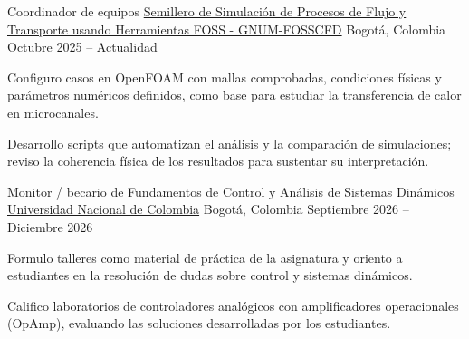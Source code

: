 

\begin{cventries}



\cventry
    {Coordinador de equipos} %
    {\href{http://www.hermes.unal.edu.co/pages/Consultas/Semillero.xhtml?id=7505}{Semillero de Simulación de Procesos de Flujo y Transporte usando Herramientas FOSS - GNUM-FOSSCFD}} %
    {Bogotá, Colombia} %
    {Octubre 2025 -- Actualidad} %
    {
    \begin{cvitems} %
    \item {Configuro casos en OpenFOAM con mallas comprobadas, condiciones físicas y parámetros numéricos definidos, como base para estudiar la transferencia de calor en microcanales.}
    \item {Desarrollo scripts que automatizan el análisis y la comparación de simulaciones; reviso la coherencia física de los resultados para sustentar su interpretación.}
    \end{cvitems}
    }

\cventry
    {Monitor / becario de Fundamentos de Control y Análisis de Sistemas Dinámicos} %
    {\href{https://drive.google.com/file/d/14qOsIPcJXvhMIV_-TyjdAwLMu4OmoJT6/view?usp=drivesdk}{Universidad Nacional de Colombia}} %
    {Bogotá, Colombia} %
    {Septiembre 2026 -- Diciembre 2026} %
    {
    \begin{cvitems}
    \item {Formulo talleres como material de práctica de la asignatura y oriento a estudiantes en la resolución de dudas sobre control y sistemas dinámicos.}
    \item {Califico laboratorios de controladores analógicos con amplificadores operacionales (OpAmp), evaluando las soluciones desarrolladas por los estudiantes.}
    \end{cvitems}
    }

\end{cventries}

